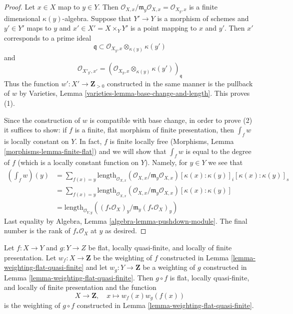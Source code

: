 \begin{proof}
Let $x \in X$ map to $y \in Y$. Then
$\mathcal{O}_{X, x}/\mathfrak m_y\mathcal{O}_{X, x} = \mathcal{O}_{X_y, x}$
is a finite dimensional $\kappa(y)$-algebra.
Suppose that $Y' \to Y$ is a morphism of schemes and $y' \in Y'$
maps to $y$ and $x' \in X' = X \times_Y Y'$ is a point mapping to
$x$ and $y'$. Then $x'$ corresponds to a prime ideal
$$
\mathfrak q \subset \mathcal{O}_{X_y, x} \otimes_{\kappa(y)} \kappa(y')
$$
and
$$
\mathcal{O}_{X'_{y'}, x'} =
(\mathcal{O}_{X_y, x} \otimes_{\kappa(y)} \kappa(y'))_{\mathfrak q}
$$
Thus the function $w' : X' \to \mathbf{Z}_{> 0}$ constructed in the
same manner is the pullback of $w$ by
Varieties, Lemma \ref{varieties-lemma-base-change-and-length}.
This proves (1).

\medskip\noindent
Since the construction of $w$ is compatible with base change,
in order to prove (2) it suffices to show: if $f$ is a finite,
flat morphism of finite presentation, then $\int_f w$
is locally constant on $Y$. In fact, $f$ is finite locally free
(Morphisms, Lemma \ref{morphisms-lemma-finite-flat})
and we will show that $\int_f w$ is equal to the degree of $f$
(which is a locally constant function on $Y$). Namely,
for $y \in Y$ we see that
\begin{align*}
(\textstyle{\int}_f w)(y)
& =
\sum\nolimits_{f(x) = y}
\text{length}_{\mathcal{O}_{X, x}}
(\mathcal{O}_{X, x}/\mathfrak m_y \mathcal{O}_{X, x})
[\kappa(x) : \kappa(y)]_i
[\kappa(x) : \kappa(y)]_s \\
& =
\sum\nolimits_{f(x) = y}
\text{length}_{\mathcal{O}_{X, x}}
(\mathcal{O}_{X, x}/\mathfrak m_y \mathcal{O}_{X, x})
[\kappa(x) : \kappa(y)] \\
& =
\text{length}_{\mathcal{O}_{Y, y}}((f_*\mathcal{O}_X)_y/
\mathfrak m_y (f_*\mathcal{O}_X)_y)
\end{align*}
Last equality by Algebra, Lemma \ref{algebra-lemma-pushdown-module}.
The final number is the rank of $f_*\mathcal{O}_X$ at $y$ as desired.
\end{proof}

\begin{lemma}
\label{lemma-weighting-composition-flat-quasi-finite}
Let $f : X \to Y$ and $g : Y \to Z$ be flat, locally quasi-finite,
and locally of finite presentation. Let $w_f : X \to \mathbf{Z}$
be the weighting of $f$ constructed in
Lemma \ref{lemma-weighting-flat-quasi-finite} and let
$w_g : Y \to \mathbf{Z}$ be a weighting of $g$ constructed in
Lemma \ref{lemma-weighting-flat-quasi-finite}.
Then $g \circ f$ is flat, locally quasi-finite, and
locally of finite presentation and the function
$$
X \longrightarrow \mathbf{Z},\quad
x \longmapsto w_f(x) w_g(f(x))
$$
is the weighting of $g \circ f$ constructed in
Lemma \ref{lemma-weighting-flat-quasi-finite}.
\end{lemma}

